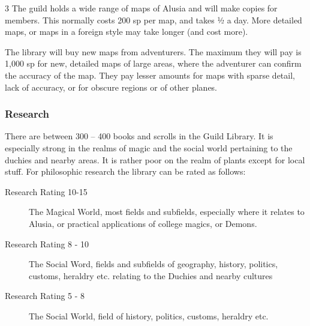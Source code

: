 \begin{multicols}{3}
The guild holds a wide range of maps of Alusia and will make copies
for members.  This normally costs 200 sp per map, and takes ½ a
day. More detailed maps, or maps in a foreign style may take longer
(and cost more).

The library will buy new maps from adventurers. The maximum they will
pay is 1,000 sp for new, detailed maps of large areas, where the
adventurer can confirm the accuracy of the map. They pay lesser
amounts for maps with sparse detail, lack of accuracy, or for obscure
regions or of other planes.

\subsubsection{Research}

There are between 300 – 400 books and
scrolls in the Guild Library. It is especially
strong in the realms of magic and the social
world pertaining to the duchies and nearby
areas. It is rather poor on the realm of plants
except for local stuff. For philosophic
research the library can be rated as follows:

\begin{description}
\item[Research Rating 10-15] The Magical World, most fields and
  subfields, especially where it relates to Alusia, or practical
  applications of college magics, or Demons.

\item[Research Rating 8 - 10] The Social Word, fields and subfields of
  geography, history, politics, customs, heraldry etc. relating to the
  Duchies and nearby cultures

\item[Research Rating 5 - 8] The Social World, field of history,
  politics, customs, heraldry etc.
\end{description}

\end{multicols}
